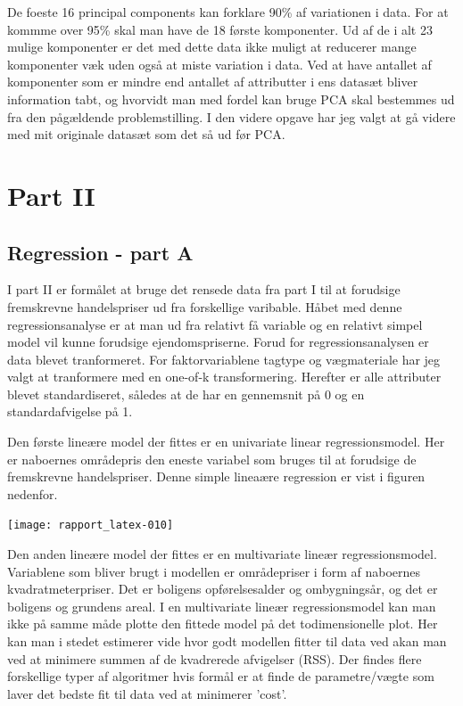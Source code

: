 \documentclass{report}
\begin{document}
De foeste 16 principal components kan forklare 90\% af variationen i data. For at kommme over 95\% skal man have de 18 første komponenter. Ud af de i alt 23 mulige komponenter er det med dette data ikke muligt at reducerer mange komponenter væk uden også at miste variation i data. 
Ved at have antallet af komponenter som er mindre end antallet af attributter i ens datasæt bliver information tabt, og hvorvidt man med fordel kan bruge PCA skal bestemmes ud fra den pågældende problemstilling. I den videre opgave har jeg valgt at gå videre med mit originale datasæt som det så ud før PCA. 

\chapter{Part II}

\section{Regression - part A}
I part II er formålet at bruge det rensede data fra part I til at forudsige fremskrevne handelspriser ud fra forskellige varibable. 
Håbet med denne regressionsanalyse er at man ud fra relativt få variable og en relativt simpel model vil kunne forudsige ejendomspriserne. 
Forud for regressionsanalysen er data blevet tranformeret. For faktorvariablene tagtype og vægmateriale har jeg valgt at tranformere med en one-of-k transformering. Herefter er alle attributer blevet standardiseret, således at de har en gennemsnit på 0 og en standardafvigelse på 1. 

Den første lineære model der fittes er en univariate linear regressionsmodel. Her er naboernes områdepris den eneste variabel som bruges til at forudsige de fremskrevne handelspriser. 
Denne simple lineaære regression er vist i figuren nedenfor. 

\texttt{[image: rapport\_latex-010]}

Den anden lineære model der fittes er en multivariate lineær regressionsmodel. 
Variablene som bliver brugt i modellen er områdepriser i form af naboernes kvadratmeterpriser. Det er boligens opførelsesalder og ombygningsår, og det er boligens og grundens areal. 
I en multivariate lineær regressionsmodel kan man ikke på samme måde plotte den fittede model på det todimensionelle plot. Her kan man i stedet estimerer vide hvor godt modellen fitter til data ved akan man ved at minimere summen af de kvadrerede afvigelser (RSS). 
Der findes flere forskellige typer af algoritmer hvis formål er at finde de parametre/vægte som laver det bedste fit til data ved at minimerer 'cost'. 
\end{document}
